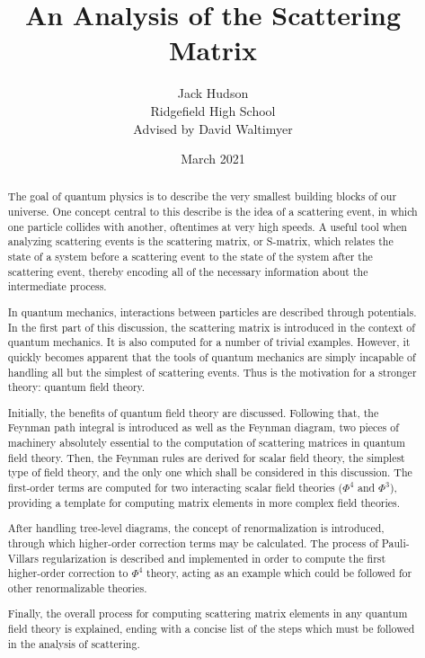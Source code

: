\documentclass{report}
\title{An Analysis of the Scattering Matrix}
\author{Jack Hudson \\ Ridgefield High School \\ Advised by David Waltimyer}
\date{March 2021}
\begin{document}
\maketitle

\begin{abstract}
The goal of quantum physics is to describe the very smallest building blocks of our universe. One concept central to this describe is the idea of a scattering event, in which one particle collides with another, oftentimes at very high speeds. A useful tool when analyzing scattering events is the scattering matrix, or S-matrix, which relates the state of a system before a scattering event to the state of the system after the scattering event, thereby encoding all of the necessary information about the intermediate process.

In quantum mechanics, interactions between particles are described through potentials. In the first part of this discussion, the scattering matrix is introduced in the context of quantum mechanics. It is also computed for a number of trivial examples. However, it quickly becomes apparent that the tools of quantum mechanics are simply incapable of handling all but the simplest of scattering events. Thus is the motivation for a stronger theory: quantum field theory.

Initially, the benefits of quantum field theory are discussed. Following that, the Feynman path integral is introduced as well as the Feynman diagram, two pieces of machinery absolutely essential to the computation of scattering matrices in quantum field theory. Then, the Feynman rules are derived for scalar field theory, the simplest type of field theory, and the only one which shall be considered in this discussion. The first-order terms are computed for two interacting scalar field theories ($\Phi^4$ and $\Phi^3$), providing a template for computing matrix elements in more complex field theories.

After handling tree-level diagrams, the concept of renormalization is introduced, through which higher-order correction terms may be calculated. The process of Pauli-Villars regularization is described and implemented in order to compute the first higher-order correction to $\Phi^4$ theory, acting as an example which could be followed for other renormalizable theories.

Finally, the overall process for computing scattering matrix elements in any quantum field theory is explained, ending with a concise list of the steps which must be followed in the analysis of scattering.
\end{abstract}
\end{document}
